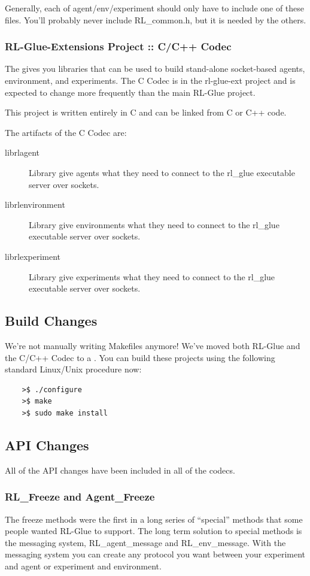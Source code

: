 \documentclass[11pt]{article}
\begin{document}
Generally, each of agent/env/experiment should only have to include one of these files.  You'll probably never include RL\_common.h, but it is needed by the others.

\subsubsection{RL-Glue-Extensions Project :: C/C++ Codec}
The  gives you libraries that can be used to build stand-alone socket-based agents, environment, and experiments.  The C Codec is in the rl-glue-ext project and is expected to change more frequently than the main RL-Glue project.

This project is written entirely in C and can be linked from C or C++ code.

The artifacts of the C Codec are:
\begin{description}
	\item [librlagent] Library give agents what they need to connect to the rl\_glue executable server over sockets.
	\item [librlenvironment] Library give environments what they need to connect to the rl\_glue executable server over sockets.
	\item [librlexperiment] Library give experiments what they need to connect to the rl\_glue executable server over sockets.
\end{description}

\subsection{Build Changes}
We're not manually writing Makefiles anymore!  We've moved both RL-Glue and the C/C++ Codec to a . You can build these projects using the following standard Linux/Unix procedure now:
\begin{verbatim}
	>$ ./configure
	>$ make
	>$ sudo make install
\end{verbatim}

\subsection{API Changes}
All of the API changes have been included in all of the codecs.

\subsubsection{RL\_Freeze and Agent\_Freeze}
The freeze methods were the first in a long series of ``special'' methods that some people wanted RL-Glue to support.  The long term solution to special methods is the messaging system, RL\_agent\_message and RL\_env\_message. With the messaging system you can create any protocol you want between your experiment and agent or experiment and environment.
\end{document}
